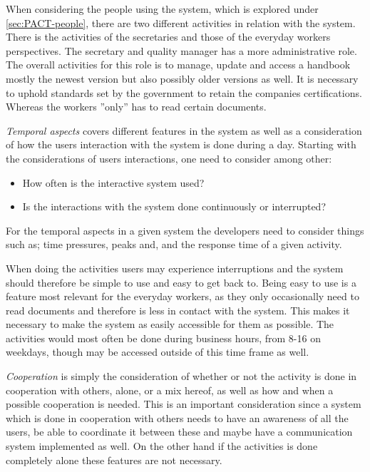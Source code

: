 When considering the people using the system, which is explored under \cref{sec:PACT-people}, there are two different activities in relation with the system.
There is the activities of the secretaries and those of the everyday workers perspectives.
The secretary and quality manager has a more administrative role.
The overall activities for this role is to manage, update and access a handbook mostly the newest version but also possibly older versions as well.
It is necessary to uphold standards set by the government to retain the companies certifications.
Whereas the workers ''only'' has to read certain documents.

\textit{Temporal aspects} covers different features in the system as well as a consideration of how the users interaction with the system is done during a day.
Starting with the considerations of users interactions, one need to consider among other:

\begin{itemize}
	\item How often is the interactive system used?
	\item Is the interactions with the system done continuously or interrupted?
\end{itemize}

For the temporal aspects in a given system the developers need to consider things such as; time pressures, peaks and, and the response time of a given activity. \citep{Benyon}

When doing the activities users may experience interruptions and the system should therefore be simple to use and easy to get back to.
Being easy to use is a feature most relevant for the everyday workers, as they only occasionally need to read documents and therefore is less in contact with the system.
This makes it necessary to make the system as easily accessible for them as possible.
The activities would most often be done during business hours, from 8-16 on weekdays, though may be accessed outside of this time frame as well.


\textit{Cooperation} is simply the consideration of whether or not the activity is done in cooperation with others, alone, or a mix hereof, as well as how and when a possible cooperation is needed.
This is an important consideration since a system which is done in cooperation with others needs to have an awareness of all the users, be able to coordinate it between these and maybe have a communication system implemented as well.
On the other hand if the activities is done completely alone these features are not necessary. \citep{Benyon}

